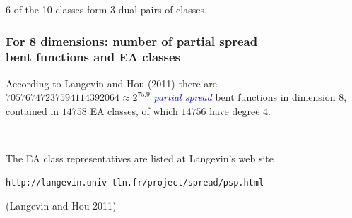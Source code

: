 \documentclass[pdf,sprung,slideColor,nocolorBG]{beamer}
\newenvironment{colortheme}[1]{
\def\ProvidesPackageRCS $##1${\relax}
\renewcommand{\ProcessOptions}{\relax}
\makeatletter

\makeatother
}{}
\newcommand{\slidecite}[1]{\tiny{(#1)}\normalsize{}}
\newcommand{\Emph}[1]{\emph{\textcolor{blue}{#1}}}
\begin{document}
\begin{colortheme}{jubata}
\begin{frame}
\begin{figure}
\begin{minipage}{.48\textwidth}
  \label{fig:c8_10_dual_cayley_graph_index_matrix}
\end{minipage}%
\end{figure}
6 of the 10 classes form 3 dual pairs of classes.
\end{frame}

\end{colortheme}

\begin{colortheme}{seagull}

\begin{frame}[fragile]
\frametitle{For 8 dimensions: number of partial spread \\ bent functions and EA classes}

According to Langevin and Hou (2011)
there are $70576747237594114392064 \approx 2^{75.9}$ \Emph{partial spread} bent functions in dimension 8,
contained in $14758$ EA classes, of which $14756$ have degree 4.

~

The EA class representatives are listed at Langevin's web site

\begin{verbatim}
http://langevin.univ-tln.fr/project/spread/psp.html
\end{verbatim}

\slidecite{Langevin and Hou 2011}
\end{frame}

\end{colortheme}
\end{document}

